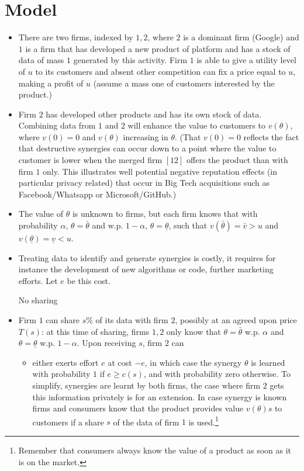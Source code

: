 \documentclass[a4paper,leqno]{article}%
\renewcommand{\t}{\theta}
\renewcommand{\a}{\alpha}
\newcommand{\ut}{\underline \theta}
\newcommand{\ot}{\bar \theta}
\newcommand{\uv}{\underline v}
\newcommand{\ov}{\bar v}
\begin{document}
\section{Model}
\begin{itemize}
    \item There are two firms, indexed by $1,2$, where $2$ is a dominant firm (Google) and $1$ is a firm that has developed a new product of platform and has a stock of data of mass $1$ generated by this activity. Firm $1$ is able to give a utility level of $u$ to its customers and absent other competition can fix a price equal to $u$, making a profit of $u$ (assume a mass one of customers interested by the product.)
    \item Firm $2$ has developed other products and has its own stock of data. Combining data from $1$ and $2$ will enhance the value to customers to $v(\t)$, where $v(0)=0$ and $v(\t)$ increasing in $\t$. (That $v(0)=0$ reflects the fact that destructive synergies can occur down to a point where the value to customer is lower when the merged firm $[12]$ offers the product than with firm $1$ only. This illustrates well potential negative reputation effects (in particular privacy related) that occur in Big Tech acquisitions such as Facebook/Whatsapp or Microsoft/GitHub.)
    \item The value of $\t$ is unknown to firms, but each firm knows that with probability $\a$, $\t=\ot$ and w.p. $1-\a$, $\t=\ut$, such that $v(\ot)=\ov>u$ and $v(\ut)=\uv<u$.
    \item Treating data to identify and generate synergies is costly, it requires for instance the development of new algorithms or code, further marketing efforts. Let $e$ be this cost. 
    \item [No sharing]
    \item Firm $1$ can share $s\%$ of its data with firm $2$, possibly at an agreed upon price $T(s)$: at this time of sharing, firms $1,2$ only know that $\t=\ot$ w.p. $\a$ and $\t=\ut$ w.p. $1-\a$. Upon receiving $s$, firm $2$ can 
    \begin{itemize}
        \item either exerts effort $e$ at cost $-e$, in which case the synergy $\t$ is learned with probability $1$ if $e\geq c(s)$, and with probability zero otherwise. To simplify, synergies are learnt by both firms, the case where firm $2$ gets this information privately is for an extension. In case synergy is known firms and consumers know that the product provides value $v(\t)s$ to customers if a share $s$ of the data of firm $1$ is used.\footnote{Remember that consumers always know the value of a product as soon as it is on the market.} 

\end{itemize}
\end{itemize}
\end{document}
